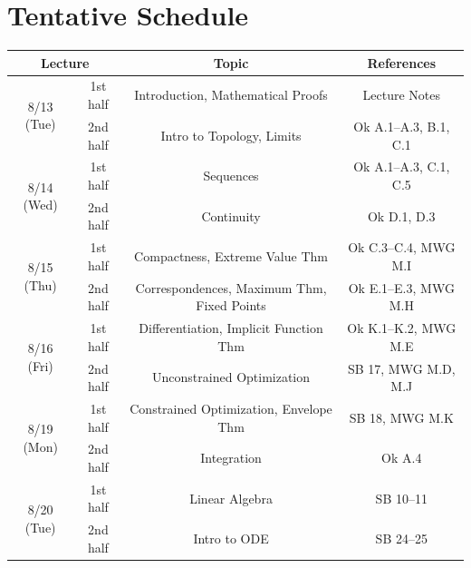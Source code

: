\documentclass[11pt]{article}
\begin{document}
\section{Tentative Schedule}
\label{sec:tentative_schedule}

\begin{table}[h]
    \centering
    \begin{tabular}{c c c c}
         \multicolumn{2}{c}{Lecture} & Topic & References \\ \hline\hline
         \multirow{2}{*}{8/13 (Tue)}& 1st half & Introduction, Mathematical Proofs & Lecture Notes \\
         & 2nd half & Intro to Topology, Limits & Ok A.1–A.3, B.1, C.1 \vspace{.35cm}\\
         \multirow{2}{*}{8/14 (Wed)}& 1st half & Sequences & Ok A.1–A.3, C.1, C.5 \\
         & 2nd half & Continuity & Ok D.1, D.3 \vspace{.35cm}\\
         \multirow{2}{*}{8/15 (Thu)}& 1st half & Compactness, Extreme Value Thm & Ok C.3–C.4, MWG M.I \\
         & 2nd half & Correspondences, Maximum Thm, Fixed Points & Ok E.1–E.3, MWG M.H \vspace{.35cm}\\
         \multirow{2}{*}{8/16 (Fri)}& 1st half & Differentiation, Implicit Function Thm & Ok K.1–K.2, MWG M.E \\
         & 2nd half & Unconstrained Optimization & SB 17, MWG M.D, M.J \vspace{.35cm}\\
         \multirow{2}{*}{8/19 (Mon)}& 1st half & Constrained Optimization, Envelope Thm & SB 18, MWG M.K \\
         & 2nd half & Integration & Ok A.4 \vspace{.35cm}\\
         \multirow{2}{*}{8/20 (Tue)}& 1st half & Linear Algebra & SB 10–11 \\
         & 2nd half & Intro to ODE & SB 24–25
    \end{tabular}
\end{table}

\end{document}
